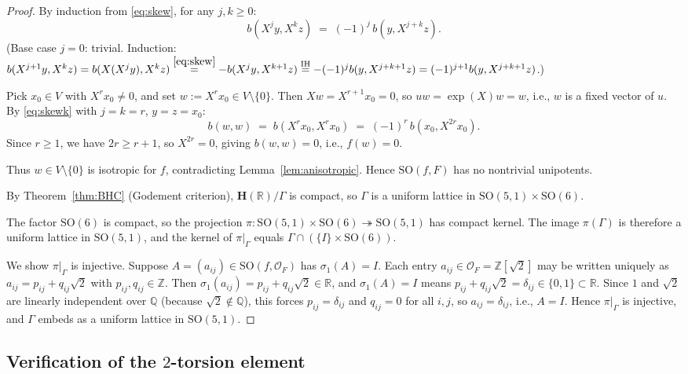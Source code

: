 \documentclass[12pt]{article}
\theoremstyle{definition}
\begin{document}
\begin{proof}
By induction from \eqref{eq:skew}, for any $j,k\geq 0$:
\begin{equation}\label{eq:skewk}
b(X^j y, X^k z) \;=\; (-1)^j\, b(y, X^{j+k}z).
\end{equation}
(Base case $j=0$: trivial. Induction: $b(X^{j+1}y, X^k z) = b(X(X^j y), X^k z) \stackrel{\eqref{eq:skew}}{=} -b(X^j y, X^{k+1}z) \stackrel{\text{IH}}{=}-(-1)^j b(y,X^{j+k+1}z)=(-1)^{j+1}b(y,X^{j+k+1}z)$.)

Pick $x_0\in V$ with $X^r x_0\neq 0$, and set $w:=X^r x_0\in V\setminus\{0\}$. Then $Xw = X^{r+1}x_0=0$, so $uw=\exp(X)w=w$, i.e., $w$ is a fixed vector of $u$. By \eqref{eq:skewk} with $j=k=r$, $y=z=x_0$:
\[
b(w,w) \;=\; b(X^r x_0, X^r x_0) \;=\; (-1)^r\, b(x_0, X^{2r} x_0).
\]
Since $r\geq 1$, we have $2r\geq r+1$, so $X^{2r}=0$, giving $b(w,w)=0$, i.e., $f(w)=0$.

Thus $w\in V\setminus\{0\}$ is isotropic for $f$, contradicting Lemma~\ref{lem:anisotropic}. Hence $\mathrm{SO}(f,F)$ has no nontrivial unipotents.

By Theorem~\ref{thm:BHC} (Godement criterion), $\mathbf{H}(\mathbb{R})/\Gamma$ is compact, so $\Gamma$ is a uniform lattice in $\mathrm{SO}(5,1)\times\mathrm{SO}(6)$.

The factor $\mathrm{SO}(6)$ is compact, so the projection $\pi:\mathrm{SO}(5,1)\times\mathrm{SO}(6)\twoheadrightarrow\mathrm{SO}(5,1)$ has compact kernel. The image $\pi(\Gamma)$ is therefore a uniform lattice in $\mathrm{SO}(5,1)$, and the kernel of $\pi|_\Gamma$ equals $\Gamma\cap(\{I\}\times\mathrm{SO}(6))$.

We show $\pi|_\Gamma$ is injective. Suppose $A=(a_{ij})\in\mathrm{SO}(f,\mathcal{O}_F)$ has $\sigma_1(A)=I$. Each entry $a_{ij}\in\mathcal{O}_F=\mathbb{Z}[\sqrt{2}]$ may be written uniquely as $a_{ij}=p_{ij}+q_{ij}\sqrt{2}$ with $p_{ij},q_{ij}\in\mathbb{Z}$. Then $\sigma_1(a_{ij})=p_{ij}+q_{ij}\sqrt{2}\in\mathbb{R}$, and $\sigma_1(A)=I$ means $p_{ij}+q_{ij}\sqrt{2}=\delta_{ij}\in\{0,1\}\subset\mathbb{R}$. Since $1$ and $\sqrt{2}$ are linearly independent over $\mathbb{Q}$ (because $\sqrt{2}\notin\mathbb{Q}$), this forces $p_{ij}=\delta_{ij}$ and $q_{ij}=0$ for all $i,j$, so $a_{ij}=\delta_{ij}$, i.e., $A=I$. Hence $\pi|_\Gamma$ is injective, and $\Gamma$ embeds as a uniform lattice in $\mathrm{SO}(5,1)$.
\end{proof}

\subsection{Verification of the $2$-torsion element}
\end{document}
